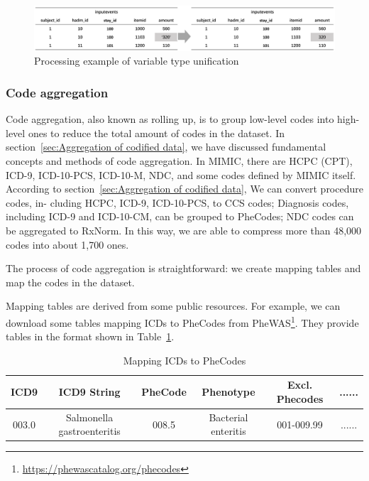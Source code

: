 \begin{figure}[ht]
    \centering
    \includegraphics[width=1\linewidth]{images/MIMIC_variable_type_unification.png}
    \caption{Processing example of variable type unification}
    \label{fig:MIMIC_variable_type_unification}
\end{figure}

\subsubsection{Code aggregation}
Code aggregation, also known as rolling up, is to group low-level codes into high-level ones to reduce the total amount of codes in the dataset. 
In section~\ref{sec:Aggregation of codified data}, we have discussed fundamental concepts and methods of code aggregation. 
In MIMIC, there are HCPC (CPT), ICD-9, ICD-10-PCS, ICD-10-M, NDC, and some codes defined by MIMIC itself.
According to section~\ref{sec:Aggregation of codified data}, We can convert procedure codes, in-
cluding HCPC, ICD-9, ICD-10-PCS, to CCS codes; 
Diagnosis codes, including ICD-9 and ICD-10-CM, can be grouped to PheCodes;
NDC codes can be aggregated to RxNorm.
In this way, we are able to compress more than 48,000 codes into about 1,700 ones.

The process of code aggregation is straightforward: we create mapping tables and map the codes in the dataset.

Mapping tables are derived from some public resources. 
For example, we can download some tables mapping ICDs to PheCodes from PheWAS\footnote{\url{https://phewascatalog.org/phecodes}}.
They provide tables in the format shown in Table~\ref{tab:phewascatalog}.

\begin{table}[ht]
\centering
\caption{Mapping ICDs to PheCodes}
\label{tab:phewascatalog}
\begin{tabular}{cccccc}
\toprule
ICD9  & ICD9 String                & PheCode & Phenotype           & Excl. Phecodes & ......     \\ \midrule
003.0 & Salmonella gastroenteritis & 008.5   & Bacterial enteritis & 001-009.99     & ...... \\ \bottomrule
\end{tabular}
\end{table}

